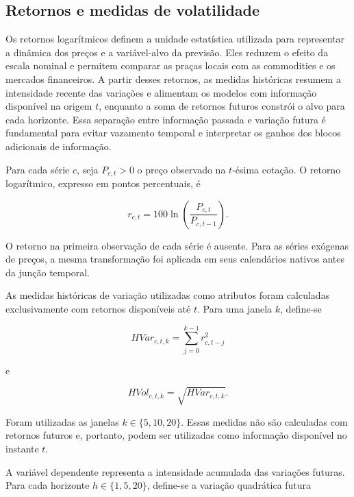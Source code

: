 \documentclass[a4paper,fleqn]{cas-sc}
\begin{document}
\subsection{Retornos e medidas de volatilidade}
\label{subsec:returns_volatility}

Os retornos logarítmicos definem a unidade estatística utilizada para representar a dinâmica dos preços e a variável-alvo da previsão. Eles reduzem o efeito da escala nominal e permitem comparar as praças locais com as commodities e os mercados financeiros. A partir desses retornos, as medidas históricas resumem a intensidade recente das variações e alimentam os modelos com informação disponível na origem \(t\), enquanto a soma de retornos futuros constrói o alvo para cada horizonte. Essa separação entre informação passada e variação futura é fundamental para evitar vazamento temporal e interpretar os ganhos dos blocos adicionais de informação.

Para cada série \(c\), seja \(P_{c,t}>0\) o preço observado na \(t\)-ésima cotação. O retorno logarítmico, expresso em pontos percentuais, é

\begin{equation}
r_{c,t}=100\ln\left(\frac{P_{c,t}}{P_{c,t-1}}\right).
\label{eq:log_return}
\end{equation}

O retorno na primeira observação de cada série é ausente. Para as séries exógenas de preços, a mesma transformação foi aplicada em seus calendários nativos antes da junção temporal.

As medidas históricas de variação utilizadas como atributos foram calculadas exclusivamente com retornos disponíveis até \(t\). Para uma janela \(k\), define-se

\begin{equation}
HVar_{c,t,k}=\sum_{j=0}^{k-1}r_{c,t-j}^{2}
\label{eq:hist_var}
\end{equation}

e

\begin{equation}
HVol_{c,t,k}=\sqrt{HVar_{c,t,k}}.
\label{eq:hist_vol}
\end{equation}

Foram utilizadas as janelas \(k\in\{5,10,20\}\). Essas medidas não são calculadas com retornos futuros e, portanto, podem ser utilizadas como informação disponível no instante \(t\).

A variável dependente representa a intensidade acumulada das variações futuras. Para cada horizonte \(h\in\{1,5,20\}\), define-se a variação quadrática futura
\end{document}
